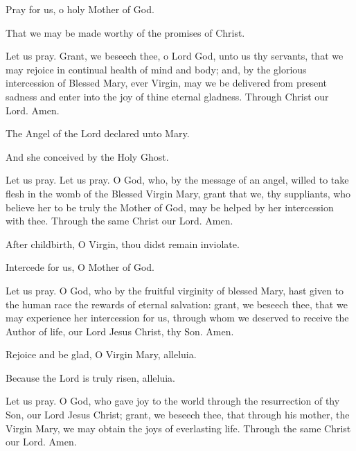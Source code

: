 { \noindent \vv Pray for us, o holy Mother of God.

\noindent \rr That we may be made worthy of the promises of Christ.


\noindent Let us pray. Grant, we beseech thee, o Lord God, unto us thy servants, that we may rejoice in continual health of mind and body; and, by the glorious intercession of Blessed Mary, ever Virgin, may we be delivered from present sadness and enter into the joy of thine eternal gladness. Through Christ our Lord. Amen.



\noindent \vv The Angel of the Lord declared unto Mary.

\noindent \rr And she conceived by the Holy Ghost.

\noindent Let us pray. \noindent Let us pray. O God, who, by the message of an angel, willed to take flesh in the womb of the Blessed Virgin Mary, grant that we, thy suppliants, who believe her to be truly the Mother of God, may be helped by her intercession with thee. Through the same Christ our Lord. Amen.


\noindent \vv After childbirth, O Virgin, thou didst remain inviolate.

\noindent \rr Intercede for us, O Mother of God.

\noindent Let us pray. O God, who by the fruitful virginity of blessed Mary, hast given to the human race the rewards of eternal salvation: grant, we beseech thee, that we may experience her intercession for us, through whom we deserved to receive the Author of life, our Lord Jesus Christ, thy Son. Amen.


\noindent \vv Rejoice and be glad, O Virgin Mary, alleluia.

\noindent \rr Because the Lord is truly risen, alleluia.

\noindent Let us pray. O God, who gave joy to the world through the resurrection of thy Son, our Lord Jesus Christ; grant, we beseech thee, that through his mother, the Virgin Mary, we may obtain the joys of everlasting life. Through the same Christ our Lord. Amen.}